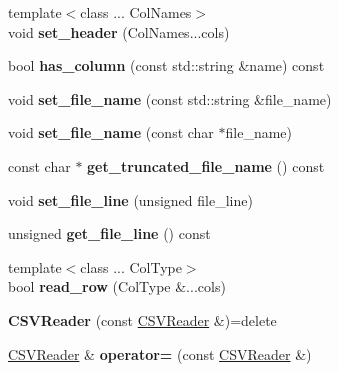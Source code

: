 \begin{DoxyCompactItemize}
{\footnotesize template$<$class ... Col\+Names$>$ }\\void {\bfseries set\+\_\+header} (Col\+Names...\+cols)
\item 
\mbox{\label{classio_1_1_c_s_v_reader_aaba91fff6faea12e451943e8d32a5a17}} 
bool {\bfseries has\+\_\+column} (const std\+::string \&name) const
\item 
\mbox{\label{classio_1_1_c_s_v_reader_a4096c1e43a4fba2b4f5ae21d047b5fbc}} 
void {\bfseries set\+\_\+file\+\_\+name} (const std\+::string \&file\+\_\+name)
\item 
\mbox{\label{classio_1_1_c_s_v_reader_a5f1dc083a8fa8661f5ecdcf6aebc7b24}} 
void {\bfseries set\+\_\+file\+\_\+name} (const char $\ast$file\+\_\+name)
\item 
\mbox{\label{classio_1_1_c_s_v_reader_abc6321895152f5a34959b499da6512ee}} 
const char $\ast$ {\bfseries get\+\_\+truncated\+\_\+file\+\_\+name} () const
\item 
\mbox{\label{classio_1_1_c_s_v_reader_a1303bd6a2eb0d3d7c743212e52839ac4}} 
void {\bfseries set\+\_\+file\+\_\+line} (unsigned file\+\_\+line)
\item 
\mbox{\label{classio_1_1_c_s_v_reader_a065f805596018d1568b81152e6a22e0c}} 
unsigned {\bfseries get\+\_\+file\+\_\+line} () const
\item 
\mbox{\label{classio_1_1_c_s_v_reader_a61ecdcaa62c024bf97c4e5d133478d7e}} 
{\footnotesize template$<$class ... Col\+Type$>$ }\\bool {\bfseries read\+\_\+row} (Col\+Type \&...cols)
\item 
\mbox{\label{classio_1_1_c_s_v_reader_a0507ac5abe201969a15df76795e13c28}} 
{\bfseries C\+S\+V\+Reader} (const \hyperlink{classio_1_1_c_s_v_reader}{C\+S\+V\+Reader} \&)=delete
\item 
\mbox{\label{classio_1_1_c_s_v_reader_a37046e6629cf4254037c14440f14141d}} 
\hyperlink{classio_1_1_c_s_v_reader}{C\+S\+V\+Reader} \& {\bfseries operator=} (const \hyperlink{classio_1_1_c_s_v_reader}{C\+S\+V\+Reader} \&)

\end{DoxyCompactItemize}
